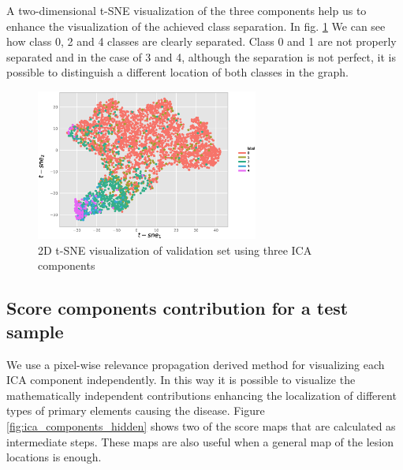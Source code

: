 \documentclass{llncs}
\begin{document}
A two-dimensional t-SNE visualization \cite{maaten2008visualizing} of the three components help us to enhance the visualization of the achieved class separation. In fig. \ref{fig:tsne} We can see how class 0, 2 and 4 classes are clearly separated. Class 0 and 1 are not properly separated and in the case of 3 and 4, although the separation is not perfect, it is possible to distinguish a different location of both classes in the graph.

\begin{figure}[h]
	\centering
	\includegraphics[width=0.65\textwidth]{./figures/tsne2d.eps}
	\caption{2D t-SNE visualization of validation set using three ICA components}  
	\label{fig:tsne} 
\end{figure}

\subsection{Score components contribution for a test sample}

We use a pixel-wise relevance propagation derived method for visualizing each ICA component independently. In this way it is possible to visualize the mathematically independent contributions enhancing the localization of different types of primary elements causing the disease. Figure \ref{fig:ica_components_hidden} shows two of the score maps that are calculated as intermediate steps. These maps are also useful when a general map of the lesion locations is enough.
\end{document}

